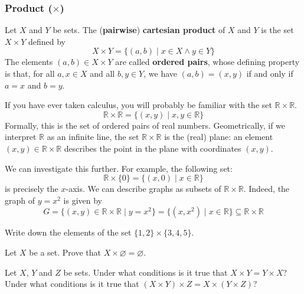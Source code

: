 \subsubsection*{Product ($\times$)}

\begin{definition}
\label{defCartesianProductPairwise}
Let $X$ and $Y$ be sets. The (\textbf{pairwise}) \textbf{cartesian product} of $X$ and $Y$ is the set $X \times Y$  defined by
\[ X \times Y = \{ (a,b) \mid x \in X \wedge y \in Y \} \]
The elements $(a,b) \in X \times Y$ are called \textbf{ordered pairs}, whose defining property is that, for all $a,x \in X$ and all $b,y \in Y$, we have $(a,b) = (x,y)$ if and only if $a=x$ and $b=y$.
\end{definition}

\begin{example}
If you have ever taken calculus, you will probably be familiar with the set $\mathbb{R} \times \mathbb{R}$.
\[ \mathbb{R} \times \mathbb{R} = \{ (x,y) \mid x,y \in \mathbb{R} \} \]
Formally, this is the set of ordered pairs of real numbers. Geometrically, if we interpret $\mathbb{R}$ as an infinite line, the set $\mathbb{R} \times \mathbb{R}$ is the (real) plane: an element $(x,y) \in \mathbb{R} \times \mathbb{R}$ describes the point in the plane with coordinates $(x,y)$.

We can investigate this further. For example, the following set:
\[ \mathbb{R} \times \{ 0 \} = \{ (x,0) \mid x \in \mathbb{R} \} \]
is precisely the $x$-axis. We can describe graphs as subsets of $\mathbb{R} \times \mathbb{R}$. Indeed, the graph of $y=x^2$ is given by
\[ G = \{ (x,y) \in \mathbb{R} \times \mathbb{R} \mid y = x^2 \} = \{ (x,x^2) \mid x \in \mathbb{R} \} \subseteq \mathbb{R} \times \mathbb{R} \]
\end{example}

\begin{exercise}
Write down the elements of the set $\{ 1, 2 \} \times \{ 3, 4, 5 \}$.
\end{exercise}

\begin{exercise}
Let $X$ be a set. Prove that $X \times \varnothing = \varnothing$.
\end{exercise}

\begin{exercise}
\label{exCartesianProductNotAssociative}
Let $X$, $Y$ and $Z$ be sets. Under what conditions is it true that $X \times Y = Y \times X$? Under what conditions is it true that $(X \times Y) \times Z = X \times (Y \times Z)$?
\end{exercise}

